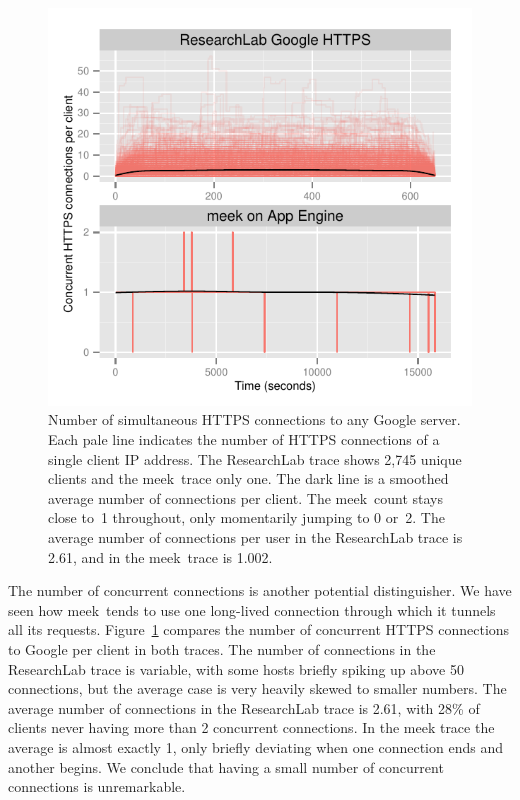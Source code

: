 \documentclass[conference]{IEEEtran}
\newcommand{\meek}{meek\xspace}
\newcommand{\lbl}{ResearchLab\xspace}
\begin{document}
\begin{figure}
\centering
\includegraphics[width=\linewidth]{concurrent.pdf}
\caption{
Number of simultaneous HTTPS connections to any Google server.
Each pale line indicates the number of HTTPS connections
of a single client IP address.
The \lbl trace shows 2,745 unique clients and the \meek\ trace only one.
The dark line is a smoothed average number of connections per client.
The \meek\ count stays close to~1 throughout, only momentarily
jumping to 0 or~2.
The average number of connections per user in the \lbl trace is 2.61,
and in the \meek\ trace is 1.002.
}
\label{fig:concurrent}
\end{figure}

The number of concurrent connections is another potential distinguisher.
We have seen how \meek\ tends to use one long-lived connection
through which it tunnels all its requests.
Figure~\ref{fig:concurrent} compares the number of concurrent HTTPS connections to
Google per client in both traces.
The number of connections in the \lbl trace is variable,
with some hosts briefly spiking up above 50 connections,
but the average case is very heavily skewed to smaller numbers.
The average number of connections in the \lbl trace is 2.61,
with 28\% of clients never having more than 2 concurrent connections.
In the \meek trace the average is almost exactly 1, only briefly
deviating when one connection ends and another begins.
We conclude that having a small number of concurrent connections is unremarkable.
\end{document}
